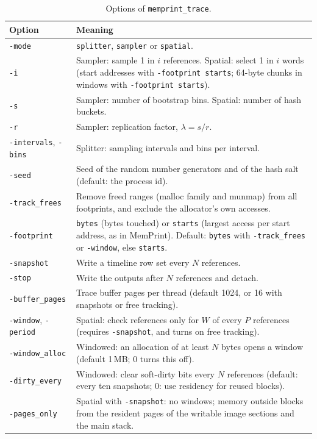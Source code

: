 \documentclass[11pt]{article}
\newcommand{\memprint}{MemPrint}
\newcommand{\knob}[1]{\texttt{-#1}}
\begin{document}
\begin{table}[h]
\centering
\small
\caption{Options of \texttt{memprint\_trace}.}
\label{tab:options}
\begin{tabular}{lp{11cm}}
\toprule
Option & Meaning \\
\midrule
\knob{mode} & \texttt{splitter}, \texttt{sampler} or \texttt{spatial}. \\
\knob{i} & Sampler: sample 1 in $i$ references. Spatial: select 1 in $i$ words (start addresses with \knob{footprint starts}; 64-byte chunks in windows with \knob{footprint starts}). \\
\knob{s} & Sampler: number of bootstrap bins. Spatial: number of hash buckets. \\
\knob{r} & Sampler: replication factor, $\lambda = s/r$. \\
\knob{intervals}, \knob{bins} & Splitter: sampling intervals and bins per interval. \\
\knob{seed} & Seed of the random number generators and of the hash salt (default: the process id). \\
\knob{track\_frees} & Remove freed ranges (malloc family and munmap) from all footprints, and exclude the allocator's own accesses. \\
\knob{footprint} & \texttt{bytes} (bytes touched) or \texttt{starts} (largest access per start address, as in \memprint{}). Default: \texttt{bytes} with \knob{track\_frees} or \knob{window}, else \texttt{starts}. \\
\knob{snapshot} & Write a timeline row set every $N$ references. \\
\knob{stop} & Write the outputs after $N$ references and detach. \\
\knob{buffer\_pages} & Trace buffer pages per thread (default 1024, or 16 with snapshots or free tracking). \\
\knob{window}, \knob{period} & Spatial: check references only for $W$ of every $P$ references (requires \knob{snapshot}, and turns on free tracking). \\
\knob{window\_alloc} & Windowed: an allocation of at least $N$ bytes opens a window (default 1\,MB; 0 turns this off). \\
\knob{dirty\_every} & Windowed: clear soft-dirty bits every $N$ references (default: every ten snapshots; 0: use residency for reused blocks). \\
\knob{pages\_only} & Spatial with \knob{snapshot}: no windows; memory outside blocks from the resident pages of the writable image sections and the main stack. \\

\end{tabular}
\end{table}
\end{document}
